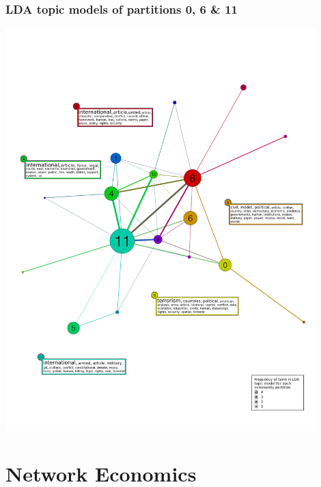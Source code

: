 \documentclass[xcolor=dvipsnames, 9pt]{beamer}
\begin{document}
\begin{frame}[fragile]
    \frametitle{LDA topic models of partitions 0, 6 \& 11}
    \includegraphics[width=12cm,clip,trim=2.1cm 0cm 0cm 11.6cm]{../images/articles_spinglass_topic_viz.pdf}
\end{frame}



\section{Network Economics} %
\label{sec:network_econonics}
\end{document}
